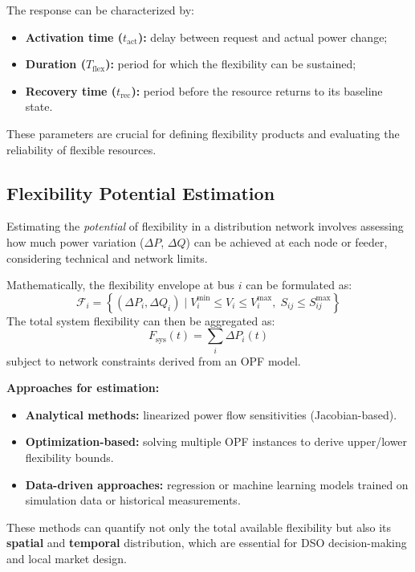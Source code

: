 \documentclass[11pt]{article}
\begin{document}
	The response can be characterized by:
	\begin{itemize}
		\item \textbf{Activation time ($t_\text{act}$):} delay between request and actual power change;
		\item \textbf{Duration ($T_\text{flex}$):} period for which the flexibility can be sustained;
		\item \textbf{Recovery time ($t_\text{rec}$):} period before the resource returns to its baseline state.
	\end{itemize}
	
	These parameters are crucial for defining flexibility products and evaluating the reliability of flexible resources.
	
	\subsection{Flexibility Potential Estimation}
	
	Estimating the \textit{potential} of flexibility in a distribution network involves assessing how much power variation ($\Delta P$, $\Delta Q$) can be achieved at each node or feeder, considering technical and network limits.
	
	Mathematically, the flexibility envelope at bus $i$ can be formulated as:
	\[
	\mathcal{F}_i = \left\{ (\Delta P_i, \Delta Q_i) \;|\; V_i^{\min} \le V_i \le V_i^{\max}, \; S_{ij} \le S_{ij}^{\max} \right\}
	\]
	The total system flexibility can then be aggregated as:
	\[
	F_\text{sys}(t) = \sum_{i} \Delta P_i(t)
	\]
	subject to network constraints derived from an OPF model.
	
	\textbf{Approaches for estimation:}
	\begin{itemize}
		\item \textbf{Analytical methods:} linearized power flow sensitivities (Jacobian-based).
		\item \textbf{Optimization-based:} solving multiple OPF instances to derive upper/lower flexibility bounds.
		\item \textbf{Data-driven approaches:} regression or machine learning models trained on simulation data or historical measurements.
	\end{itemize}
	
	These methods can quantify not only the total available flexibility but also its \textbf{spatial} and \textbf{temporal} distribution, which are essential for DSO decision-making and local market design.
	
\end{document}
